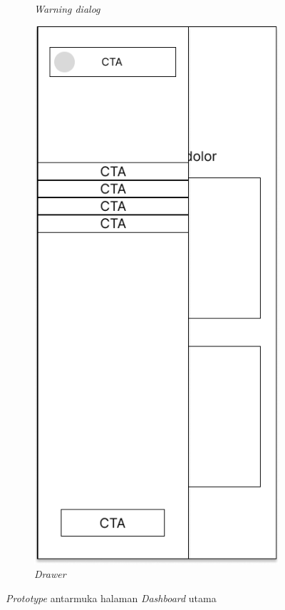 \begin{figure}[H]
\begin{subfigure}[b]{0.3\textwidth}
	  \caption{\textit{Warning dialog}}
	  \label{fig:ActivityMain3}
	\end{subfigure}
	\begin{subfigure}[b]{0.3\textwidth}
		\centering
	  \includegraphics[width=\linewidth]{contents/chapter-3/images/MF-home-3.png}
	  \caption{\textit{Drawer}}
	  \label{fig:ActivityMain4}
	\end{subfigure}
	\caption{\textit{Prototype} antarmuka halaman \textit{Dashboard} utama}
	\label{Fig:FeatureSetDashboard}
\end{figure}
